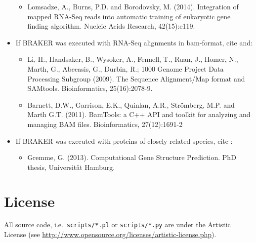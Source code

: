 \documentclass[]{article}
\providecommand{\tightlist}{%
  \setlength{\itemsep}{0pt}\setlength{\parskip}{0pt}}
\begin{document}
\begin{itemize}
  \begin{itemize}
  \tightlist
  \item
    Lomsadze, A., Burns, P.D. and Borodovsky, M. (2014). Integration of
    mapped RNA-Seq reads into automatic training of eukaryotic gene
    finding algorithm. Nucleic Acids Research, 42(15):e119.
  \end{itemize}
\item
  If BRAKER was executed with RNA-Seq alignments in bam-format, cite
  and:

  \begin{itemize}
  \item
    Li, H., Handsaker, B., Wysoker, A., Fennell, T., Ruan, J., Homer,
    N., Marth, G., Abecasis, G., Durbin, R.; 1000 Genome Project Data
    Processing Subgroup (2009). The Sequence Alignment/Map format and
    SAMtools. Bioinformatics, 25(16):2078-9.
  \item
    Barnett, D.W., Garrison, E.K., Quinlan, A.R., Strömberg, M.P. and
    Marth G.T. (2011). BamTools: a C++ API and toolkit for analyzing and
    managing BAM files. Bioinformatics, 27(12):1691-2
  \end{itemize}
\item
  If BRAKER was executed with proteins of closely related species, cite
  :

  \begin{itemize}
  \tightlist
  \item
    Gremme, G. (2013). Computational Gene Structure Prediction. PhD
    thesis, Universität Hamburg.
  \end{itemize}
\end{itemize}

\section{License}\label{licence}

All source code, i.e.~\texttt{scripts/*.pl} or \texttt{scripts/*.py} are
under the Artistic License (see
\url{http://www.opensource.org/licenses/artistic-license.php}).



\end{document}
